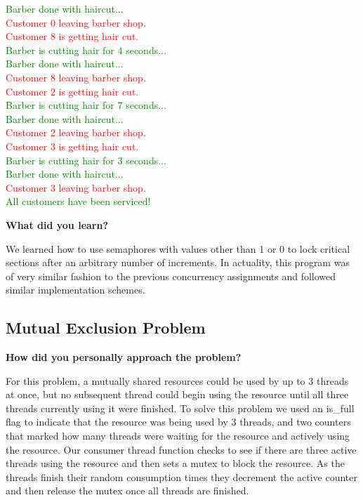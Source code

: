 \documentclass[10pt,letterpaper,draftclsnofoot,onecolumn]{IEEEtran}
\begin{document}
{\selectfont
\noindent \textcolor{green}{Barber done with haircut...}\\
\textcolor{red}{Customer 0 leaving barber shop.}\\
\textcolor{red}{Customer 8 is getting hair cut.}\\
\textcolor{green}{Barber is cutting hair for 4 seconds...}\\
\textcolor{green}{Barber done with haircut...}\\
\textcolor{red}{Customer 8 leaving barber shop.}\\
\textcolor{red}{Customer 2 is getting hair cut.}\\
\textcolor{green}{Barber is cutting hair for 7 seconds...}\\
\textcolor{green}{Barber done with haircut...}\\
\textcolor{red}{Customer 2 leaving barber shop.}\\
\textcolor{red}{Customer 3 is getting hair cut.}\\
\textcolor{green}{Barber is cutting hair for 3 seconds...}\\
\textcolor{green}{Barber done with haircut...}\\
\textcolor{red}{Customer 3 leaving barber shop.}\\
\textcolor{green}{All customers have been serviced!}\\
}
\bigskip

\noindent\textbf{What did you learn?}
\medskip

\medskip

\noindent We learned how to use semaphores with values other than 1 or 0 to lock critical sections after an arbitrary number of increments. In actuality, this program was of very similar fashion to the previous concurrency assignments and followed similar implementation schemes.

\bigskip

\subsection{Mutual Exclusion Problem}
\medskip

\noindent\textbf{How did you personally approach the problem?}
\medskip

\noindent For this problem, a mutually shared resources could be used by up to 3 threads at once, but no subsequent thread could begin using the resource until all three threads currently using it were finished. To solve this problem we used an is\_full flag to indicate that the resource was being used by 3 threads, and two counters that marked how many threads were waiting for the resource and actively using the resource. Our consumer thread function checks to see if there are three active threads using the resource and then sets a mutex to block the resource. As the threads finish their random consumption times they decrement the active counter and then release the mutex once all threads are finished.\\
\end{document}

